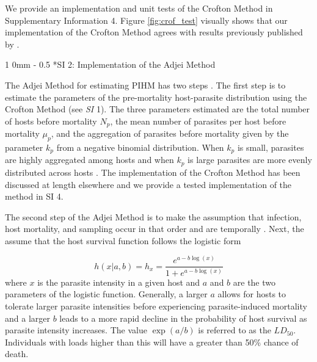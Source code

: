 \documentclass[12pt, a4paper]{article}
\makeatletter
\renewcommand{\section}{\@startsection
{section}%
{1}%
{0mm}%
{-\baselineskip}%
{0.5\baselineskip}%
{\normalfont\bf\large}} %
\makeatother
\begin{document}
We provide an implementation and unit tests of the Crofton Method in  Supplementary Information 4.  Figure \ref{fig:crof_test} visually shows that our implementation of the Crofton Method agrees with results previously published by \cite{Crofton1971a}.

\section*{SI 2: Implementation of the Adjei Method}

The Adjei Method for estimating PIHM has two steps \citep{Adjei1986}.  The first
step is to estimate the parameters of the pre-mortality host-parasite
distribution using the Crofton Method (see \emph{SI} 1).  The three parameters estimated are the
total number of hosts before mortality $N_p$,  the mean number of parasites per
host before mortality $\mu_p$, and the aggregation of parasites before
mortality given by the parameter $k_p$ from a negative binomial distribution.
When $k_p$ is small, parasites are highly aggregated among hosts and when
$k_p$ is large parasites are more evenly distributed across hosts \citep{Wilson2002}.  The implementation of the Crofton Method has been discussed at length elsewhere \citep[e.g.][ and in \emph{SI} 4]{Royce1990,Lester1984} and we provide a tested implementation of the method in SI 4.

The second step of the Adjei Method is to make the assumption that infection, host mortality, and sampling occur in that order and are temporally \cite{Adjei1986}. Next, the \citeauthor{Adjei1986} assume that the host survival function follows the logistic form

\begin{equation}
    h(x | a, b) = h_x = \dfrac{e^{a - b \log(x)}}{1 + e^{a - b \log(x)}}
    \label{eq:logistic}
\end{equation}
where $x$ is the parasite intensity in a given host and $a$ and $b$ are the two
parameters of the logistic function. Generally, a larger $a$ allows for hosts to
tolerate larger parasite intensities before experiencing parasite-induced mortality
and a larger $b$ leads to a more rapid decline in the probability of host
survival as parasite intensity increases. The value $\exp(a / b)$ is referred
to as the $LD_{50}$. Individuals with loads higher than this will have a greater than 50\% chance of death.
\end{document}
